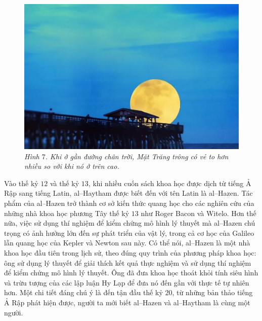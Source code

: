 \begin{multicols}{2}
	\begin{figure}[H]
		\vspace*{-5pt}
		\centering
		\captionsetup{labelformat= empty, justification=centering}
		\includegraphics[width= 1\linewidth]{8}
		\caption{\small\textit{\color{lichsutoanhoc}Hình $7$. Khi ở gần đường chân trời, Mặt Trăng trông có vẻ to hơn nhiều so với khi nó ở trên cao.}}
		\vspace*{-10pt}
	\end{figure}
	Vào thế kỷ $12$ và thế kỷ $13$, khi nhiều cuốn sách khoa học được dịch từ tiếng Ả Rập sang tiếng Latin, al--Haytham được biết đến với tên Latin là al--Hazen. Tác phẩm của al--Hazen trở thành cơ sở kiến thức quang học cho các nghiên cứu của những nhà khoa học phương Tây thế kỷ $13$ như Roger Bacon và Witelo. Hơn thế nữa, việc sử dụng thí nghiệm để kiểm chứng mô hình lý thuyết mà al--Hazen chú trọng có ảnh hưởng lớn đến sự phát triển của vật lý, trong cả cơ học của Galileo lẫn quang học của Kepler và Newton sau này. Có thể nói, al--Hazen là một nhà khoa học đầu tiên trong lịch sử, theo đúng quy trình của phương pháp khoa học: ông sử dụng lý thuyết để giải thích kết quả thực nghiệm và sử dụng thí nghiệm để kiểm chứng mô hình lý thuyết. Ông đã đưa khoa học thoát khỏi tính siêu hình và trừu tượng của các lập luận Hy Lạp để đưa nó đến gần với thực tế tự nhiên hơn. Một chi tiết đáng chú ý là đến tận đầu thế kỷ $20$, từ những bản thảo tiếng Ả Rập phát hiện được, người ta mới biết al--Hazen và al--Haytham là cùng một người.
	\begin{figure}[H]
		\vspace*{5pt}
		\centering
		\captionsetup{labelformat= empty, justification=centering}

\end{figure}
\end{multicols}
